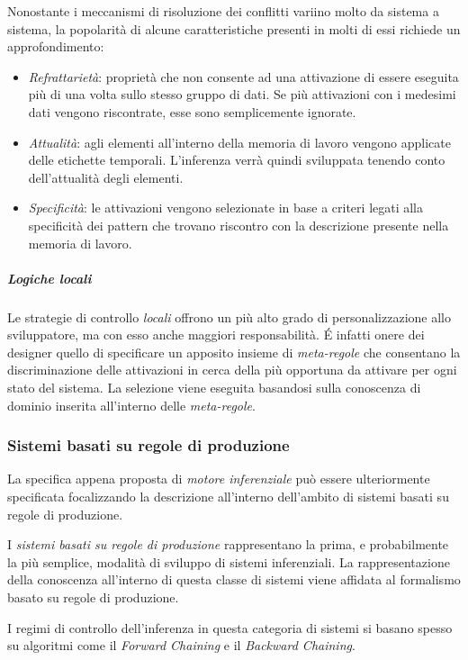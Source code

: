 Nonostante i meccanismi di risoluzione dei conflitti variino molto da sistema a sistema, la popolarità di alcune caratteristiche presenti in molti di essi richiede un approfondimento:

\begin{itemize}
	\item \emph{Refrattarietà}: proprietà che non consente ad una attivazione di essere eseguita più di una volta sullo stesso gruppo di dati. Se più attivazioni con i medesimi dati vengono riscontrate, esse sono semplicemente ignorate.
	\item \emph{Attualità}: agli elementi all'interno della memoria di lavoro vengono applicate delle etichette temporali. L'inferenza verrà quindi sviluppata tenendo conto dell'attualità degli elementi.
	\item \emph{Specificità}: le attivazioni vengono selezionate in base a criteri legati alla specificità dei pattern che trovano riscontro con la descrizione presente nella memoria di lavoro.
\end{itemize}

\subparagraph{Logiche locali} Le strategie di controllo \emph{locali} offrono un più alto grado di personalizzazione allo sviluppatore, ma con esso anche maggiori responsabilità. \'E infatti onere dei designer quello di specificare un apposito insieme di \emph{meta-regole} che consentano la discriminazione delle attivazioni in cerca della più opportuna da attivare per ogni stato del sistema. La selezione viene eseguita basandosi sulla conoscenza di dominio inserita all'interno delle \emph{meta-regole}.

\subsubsection{Sistemi basati su regole di produzione}

La specifica appena proposta di \emph{motore inferenziale} può essere ulteriormente specificata focalizzando la descrizione all'interno dell'ambito di sistemi basati su regole di produzione.

I \emph{sistemi basati su regole di produzione} rappresentano la prima, e probabilmente la più semplice, modalità di sviluppo di sistemi inferenziali. La rappresentazione della conoscenza all'interno di questa classe di sistemi viene affidata al formalismo basato su regole di produzione.

I regimi di controllo dell'inferenza in questa categoria di sistemi si basano spesso su algoritmi come il \emph{Forward Chaining} e il \emph{Backward Chaining}.


